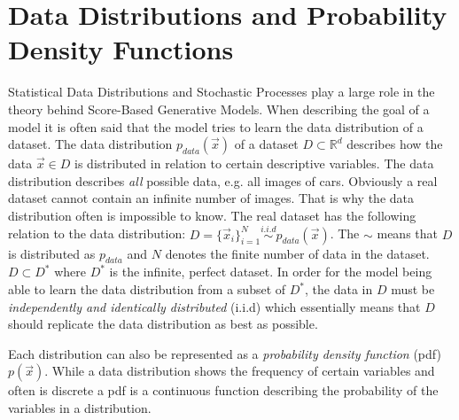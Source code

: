 \section[Data Distributions and Probability Density Functions]{Data Distributions and Probability Density Functions%
    } \label{sec:3.3}
Statistical Data Distributions and Stochastic Processes play a large role in the theory behind Score-Based Generative Models. When describing the goal of a model it is often said that the model tries to learn the data distribution of a dataset. The data distribution $p_{data}(\vec{x})$ of a dataset $D\subset\mathbb{R}^d$  describes how the data $\vec{x}\in D$ is distributed in relation to certain descriptive variables. The data distribution describes \textit{all} possible data, e.g. all images of cars. Obviously a real dataset cannot contain an infinite number of images. That is why the data distribution often is impossible to know. The real dataset has the following relation to the data distribution: $D=\{\vec{x}_i\}_{i=1}^N\overset{i.i.d}{\sim}p_{data}(\vec{x})$. The $\sim$ means that $D$ is distributed as $p_{data}$ and $N$ denotes the finite number of data in the dataset. $D\subset D^*$ where $D^*$ is the infinite, perfect dataset. In order for the model being able to learn the data distribution from a subset of $D^*$, the data in $D$ must be \textit{independently and identically distributed} (i.i.d) which essentially means that $D$ should replicate the data distribution as best as possible.

Each distribution can also be represented as a \textit{probability density function} (pdf) $p(\vec{x})$. While a data distribution shows the frequency of certain variables and often is discrete a pdf is a continuous function describing the probability of the variables in a distribution. 